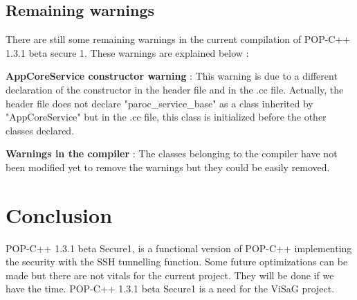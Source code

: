 \subsection{Remaining warnings}
There are still some remaining warnings in the current compilation of POP-C++ 1.3.1 beta secure 1. These warnings are explained below : \s

\textbf{AppCoreService constructor warning} : This warning is due to a different declaration of the constructor in the header file and in the .cc file. Actually, the header file does not declare "paroc\_service\_base" as a class inherited by "AppCoreService" but in the .cc file, this class is initialized before the other classes declared.\s

\textbf{Warnings in the compiler} : The classes belonging to the compiler have not been modified yet to remove the warnings but they could be easily removed.\s



\section{Conclusion}
POP-C++ 1.3.1 beta Secure1, is a functional version of POP-C++ implementing the security with the SSH tunnelling function. Some future optimizations can be made but there are not vitals for the current project. They will be done if we have the time. POP-C++ 1.3.1 beta Secure1 is a need for the ViSaG project.



